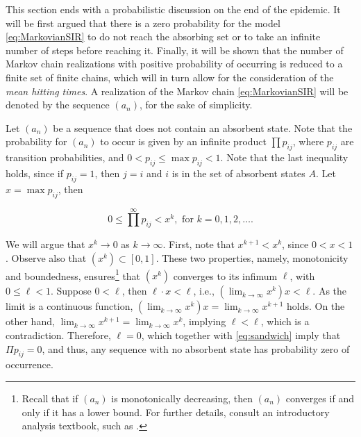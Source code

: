 \documentclass[a4paper,preprint]{elsarticle}
\begin{document}

This section ends with a probabilistic discussion on the end of the epidemic. It will be first argued that there is a zero probability for the model \eqref{eq:MarkovianSIR} to do not reach the absorbing set or to take an infinite number of steps before reaching it. Finally, it will be shown that the number of Markov chain realizations with positive probability of occurring is reduced to a finite set of finite chains, which will in turn allow for the consideration of the \textit{mean hitting times}. A realization of the Markov chain \eqref{eq:MarkovianSIR} will be denoted by the sequence $(a_n)$, for the sake of simplicity.

Let $(a_n)$ be a sequence that does not contain an absorbent state. Note that the probability for $(a_n)$ to occur is given by an infinite product $\prod p_ {ij}$, where $p_ {ij}$ are transition probabilities, and 
$0<p_ {ij}\leq \max p_ {ij}<1$. Note that the last inequality holds, since if $p_ {ij}=1$, then $j=i$ and $i$ is in the set of absorbent states $A$. Let $x=\max p_ {ij}$, then 

\begin{equation}
\label{eq:sandwich}
 0 \leq \prod^{\infty} p_ {ij} <  x^{k}, \mbox{ for }k=0,1,2,\ldots.   
\end{equation}



We will argue that $x^k \rightarrow 0$ as $k \rightarrow \infty$. First, note that $x^{k+1}<x^k$, since $0<x<1$. Observe also that $(x^k) \subset [0,1]$. These two properties, namely, monotonicity and boundedness, ensures\footnote{Recall that if $(a_n)$ is monotonically decreasing, then $(a_n)$ converges if and only if it has a lower bound. For further details, consult an introductory analysis textbook, such as \cite{BabyRudin}.} that $(x^k)$ converges to its infimum $\ell$, with $0 \leq \ell <1$. Suppose $0 < \ell$, then $\ell \cdot x < \ell$, i.e., $(\lim_{k \rightarrow \infty} x^k)x<\ell$. As the limit is a continuous function, $(\lim_{k \rightarrow \infty} x^k)x=\lim_{k \rightarrow \infty} x^{k+1}$ holds. On the other hand, $\lim_{k \rightarrow \infty} x^{k+1}=\lim_{k \rightarrow \infty} x^{k}$, implying $\ell < \ell$, which is a contradiction. Therefore, $\ell=0$, which together with \eqref{eq:sandwich} imply that $\Pi p_ {ij}=0$, and thus, any sequence with no absorbent state has probability zero of occurrence. 
\end{document}
